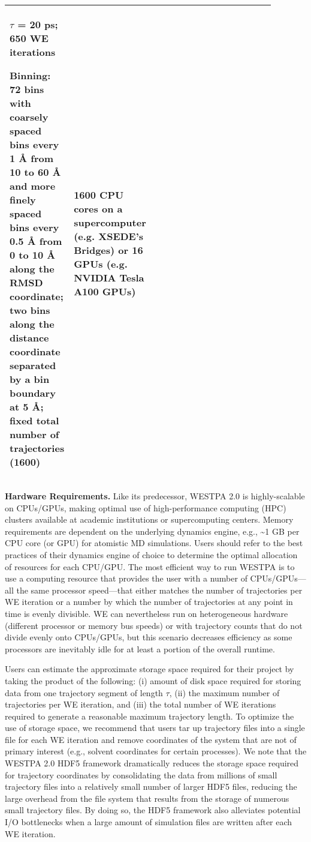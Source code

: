 \begin{table*}
\begin{tabular}{ | p{0.11\linewidth} | p{0.30\linewidth} | p{0.30\linewidth} | p{0.17\linewidth} |}
$\tau$ = 20 ps; 650 WE iterations

Binning: 72 bins with coarsely spaced bins every 1 \AA{} from 10 to 60 \AA{} and more finely spaced bins every 0.5 \AA{} from 0 to 10 \AA{} along the RMSD coordinate; two bins along the distance coordinate separated by a bin boundary at 5 \AA{}; fixed total number of trajectories (1600)& 
1600 CPU cores on a supercomputer (e.g. XSEDE’s Bridges) or 16 GPUs (e.g. NVIDIA Tesla A100 GPUs) \\
\hline
\end{tabular}
\end{table*}

\textbf{Hardware Requirements.} Like its predecessor, WESTPA 2.0 is highly-scalable on CPUs/GPUs, making optimal use of high-performance computing (HPC) clusters available at academic institutions or supercomputing centers. 
Memory requirements are dependent on the underlying dynamics engine, e.g., \textasciitilde1 GB per CPU core (or GPU) for atomistic MD simulations. 
Users should refer to the best practices of their dynamics engine of choice to determine the optimal allocation of resources for each CPU/GPU. 
The most efficient way to run WESTPA is to use a computing resource that provides the user with a number of CPUs/GPUs---all the same processor speed---that either matches the number of trajectories per WE iteration or a number by which the number of trajectories at any point in time is evenly divisible. 
WE can nevertheless run on heterogeneous hardware (different processor or memory bus speeds) or with trajectory counts that do not divide evenly onto CPUs/GPUs, but this scenario decreases efficiency as some processors are inevitably idle for at least a portion of the overall runtime.

Users can estimate the approximate storage space required for their project by taking the product of the following: (i) amount of disk space required for storing data from one trajectory segment of length $\tau$, (ii) the maximum number of trajectories per WE iteration, and (iii) the total number of WE iterations required to generate a reasonable maximum trajectory length. 
To optimize the use of storage space, we recommend that users tar up trajectory files into a single file for each WE iteration and remove coordinates of the system that are not of primary interest (e.g., solvent coordinates for certain processes). 
We note that the WESTPA 2.0 HDF5 framework dramatically reduces the storage space required for trajectory coordinates by consolidating the data from millions of small trajectory files into a relatively small number of larger HDF5 files, reducing the large overhead from the file system that results from the storage of numerous small trajectory files. 
By doing so, the HDF5 framework also alleviates potential I/O bottlenecks when a large amount of simulation files are written after each WE iteration. 